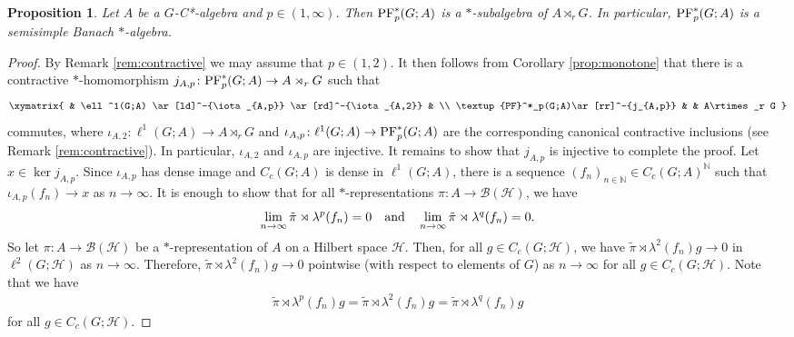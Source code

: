 \documentclass[12pt]{amsart}
\newtheorem{prop}[thm]{Proposition}
\theoremstyle{definition}
\theoremstyle{remark}
\numberwithin{equation}{section}
\newcommand{\N}{\mathbb{N}}
\begin{document}
\begin{prop}\label{cp:cp:nestedAlg}
	Let $A$ be a $G$-C*-algebra and $p\in (1,\infty)$. Then 
    $\textup{PF}^*_p(G;A)$ is a $*$-subalgebra of $A\rtimes_r G$. In particular, $\textup{PF}^*_p(G;A)$ is a semisimple Banach $*$-algebra.
\end{prop}

\begin{proof}
By Remark \ref{rem:contractive} we may assume that $p \in (1,2)$.
It then follows from Corollary \ref{prop:monotone} that there is a contractive $*$-homomorphism
	$j_{A,p}\colon \textup{PF}_p^*(G;A) \to A\rtimes_r G$
	such that
	\begin{equation*}
		\xymatrix{
			& \ell^1(G;A) \ar[ld]^-{\iota_{A,p}} \ar[rd]^-{\iota_{A,2}} & \\
			\textup{PF}^*_p(G;A)\ar[rr]^-{j_{A,p}} & & A\rtimes_r G
		}
	\end{equation*}
	commutes, where $\iota_{A,2}\colon \ell^1(G;A)\to A\rtimes_r G$ and $\iota_{A,p}\colon  \ell^1(G;A) \to \textup{PF}_p^*(G;A)$ are the corresponding canonical contractive inclusions (see Remark \ref{rem:contractive}). In particular, $\iota_{A,2}$ and $\iota_{A,p}$ are injective. It remains to show that $j_{A,p}$ is injective to complete the 	proof. Let $x\in \ker j_{A,p}$. Since $\iota_{A,p}$ has dense image and $C_c(G;A)$ is dense in $\ell^1(G;A)$, there is a sequence $(f_n)_{n\in \N}\in C_c(G;A)^\mathbb{N}$ such that $\iota_{A,p}(f_n) \to x$ as $n\to \infty$.	
	It is enough to show that for all $*$-representations $\pi\colon A \to \mathcal{B}(\mathcal{H})$, we have
\begin{equation}\label{eq10}
	\lim_{n\to\infty}\tilde{\pi}\rtimes \lambda^p(f_n)=0\quad\textnormal{and}\quad \lim_{n\to\infty}\tilde{\pi}\rtimes \lambda^q(f_n) =0.
	\end{equation}
So let $\pi\colon A \to \mathcal{B}(\mathcal{H})$ be a $*$-representation of $A$ on a Hilbert space $\mathcal{H}$. Then, for all $g\in C_c(G;\mathcal{H})$, we have $\tilde{\pi}\rtimes \lambda^2(f_n)g \to 0$ in $\ell^2(G;\mathcal{H})$ as $n\to \infty$. Therefore, $\tilde{\pi}\rtimes \lambda^2(f_n)g \to 0$
	pointwise (with respect to elements of $G$) as $n\to \infty$ for all $g\in C_c(G;\mathcal{H})$. Note that we have
	\begin{align}\label{cp:cp:eq:regrep}
		\tilde{\pi}\rtimes \lambda^p(f_n)g = \tilde{\pi}\rtimes \lambda^2(f_n) g
		= \tilde{\pi}\rtimes \lambda^q(f_n) g
	\end{align}
	for all $g\in C_c(G;\mathcal{H})$.
	

\end{proof}
\end{document}
